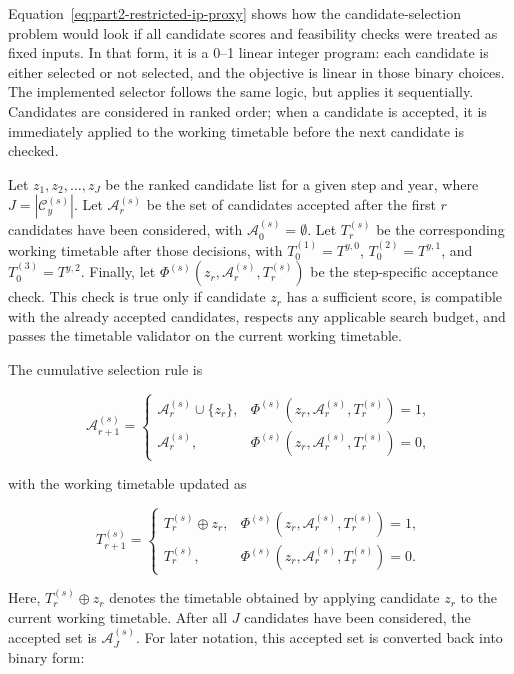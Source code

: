 \documentclass[preprint,12pt]{elsarticle}
\begin{document}
Equation~\eqref{eq:part2-restricted-ip-proxy} shows how the candidate-selection problem would look if all candidate scores and feasibility checks were treated as fixed inputs. In that form, it is a 0--1 linear integer program: each candidate is either selected or not selected, and the objective is linear in those binary choices. The implemented selector follows the same logic, but applies it sequentially. Candidates are considered in ranked order; when a candidate is accepted, it is immediately applied to the working timetable before the next candidate is checked.

Let \(z_1,z_2,\ldots,z_J\) be the ranked candidate list for a given step and year, where \(J=|\mathcal{C}^{(s)}_y|\). Let \(\mathcal{A}^{(s)}_r\) be the set of candidates accepted after the first \(r\) candidates have been considered, with \(\mathcal{A}^{(s)}_0=\emptyset\). Let \(T^{(s)}_r\) be the corresponding working timetable after those decisions, with \(T^{(1)}_0=T^{y,0}\), \(T^{(2)}_0=T^{y,1}\), and \(T^{(3)}_0=T^{y,2}\). Finally, let \(\Phi^{(s)}(z_r,\mathcal{A}^{(s)}_r,T^{(s)}_r)\) be the step-specific acceptance check. This check is true only if candidate \(z_r\) has a sufficient score, is compatible with the already accepted candidates, respects any applicable search budget, and passes the timetable validator on the current working timetable.


The cumulative selection rule is

\begin{equation}
\mathcal{A}^{(s)}_{r+1}
=
\begin{cases}
\mathcal{A}^{(s)}_r\cup\{z_r\},
& \Phi^{(s)}(z_r,\mathcal{A}^{(s)}_r,T^{(s)}_r)=1,\\[4pt]
\mathcal{A}^{(s)}_r,
& \Phi^{(s)}(z_r,\mathcal{A}^{(s)}_r,T^{(s)}_r)=0,
\end{cases}
\label{eq:part2-cumulative-selection}
\end{equation}

with the working timetable updated as

\begin{equation}
T^{(s)}_{r+1}
=
\begin{cases}
T^{(s)}_r\oplus z_r,
& \Phi^{(s)}(z_r,\mathcal{A}^{(s)}_r,T^{(s)}_r)=1,\\[4pt]
T^{(s)}_r,
& \Phi^{(s)}(z_r,\mathcal{A}^{(s)}_r,T^{(s)}_r)=0.
\end{cases}
\label{eq:part2-working-timetable-update}
\end{equation}

Here, \(T^{(s)}_r\oplus z_r\) denotes the timetable obtained by applying candidate \(z_r\) to the current working timetable. After all \(J\) candidates have been considered, the accepted set is \(\mathcal{A}^{(s)}_J\). For later notation, this accepted set is converted back into binary form:
\end{document}
